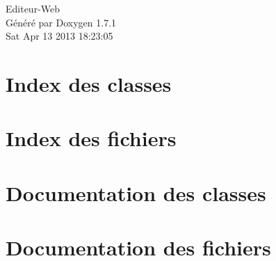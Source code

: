 \documentclass[a4paper]{book}
\begin{document}
\hypersetup{pageanchor=false}
\begin{titlepage}
\vspace*{7cm}
\begin{center}
{\Large Editeur-\/Web }\\
\vspace*{1cm}
{\large Généré par Doxygen 1.7.1}\\
\vspace*{0.5cm}
{\small Sat Apr 13 2013 18:23:05}\\
\end{center}
\end{titlepage}
\clearemptydoublepage
{}
\tableofcontents
\clearemptydoublepage
{}
\hypersetup{pageanchor=true}
\chapter{Index des classes}

\chapter{Index des fichiers}

\chapter{Documentation des classes}









\chapter{Documentation des fichiers}



\printindex
\end{document}
